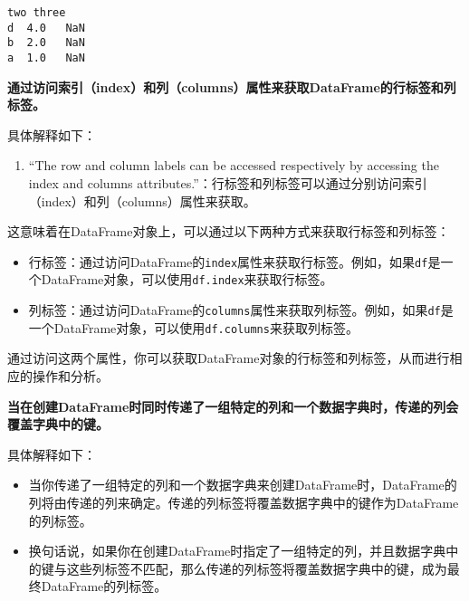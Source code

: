 \documentclass[11pt]{ctexart}
\makeatletter
\providecommand{\tightlist}{%
      \setlength{\itemsep}{0pt}\setlength{\parskip}{0pt}}
\newcommand{\boxspacing}{\kern\kvtcb@left@rule\kern\kvtcb@boxsep}
\newcommand{\prompt}[4]{
        {\ttfamily\llap{{\color{#2}[#3]:\hspace{3pt}#4}}\vspace{-\baselineskip}}
    }
\makeatother
\begin{document}
            \begin{tcolorbox}[breakable, size=fbox, boxrule=.5pt, pad at break*=1mm, opacityfill=0]
\prompt{Out}{outcolor}{225}{\boxspacing}
\begin{Verbatim}[commandchars=\\\{\}]
   two three
d  4.0   NaN
b  2.0   NaN
a  1.0   NaN
\end{Verbatim}
\end{tcolorbox}
        
    \textbf{通过访问索引（index）和列（columns）属性来获取DataFrame的行标签和列标签。}

具体解释如下：

\begin{enumerate}
\def\labelenumi{\arabic{enumi}.}
\tightlist
\item
  ``The row and column labels can be accessed respectively by accessing
  the index and columns
  attributes.''：行标签和列标签可以通过分别访问索引（index）和列（columns）属性来获取。
\end{enumerate}

这意味着在DataFrame对象上，可以通过以下两种方式来获取行标签和列标签：

\begin{itemize}
\item
  行标签：通过访问DataFrame的\texttt{index}属性来获取行标签。例如，如果\texttt{df}是一个DataFrame对象，可以使用\texttt{df.index}来获取行标签。
\item
  列标签：通过访问DataFrame的\texttt{columns}属性来获取列标签。例如，如果\texttt{df}是一个DataFrame对象，可以使用\texttt{df.columns}来获取列标签。
\end{itemize}

通过访问这两个属性，你可以获取DataFrame对象的行标签和列标签，从而进行相应的操作和分析。

\textbf{当在创建DataFrame时同时传递了一组特定的列和一个数据字典时，传递的列会覆盖字典中的键。}

具体解释如下：

\begin{itemize}
\item
  当你传递了一组特定的列和一个数据字典来创建DataFrame时，DataFrame的列将由传递的列来确定。传递的列标签将覆盖数据字典中的键作为DataFrame的列标签。
\item
  换句话说，如果你在创建DataFrame时指定了一组特定的列，并且数据字典中的键与这些列标签不匹配，那么传递的列标签将覆盖数据字典中的键，成为最终DataFrame的列标签。
\end{itemize}
\end{document}
